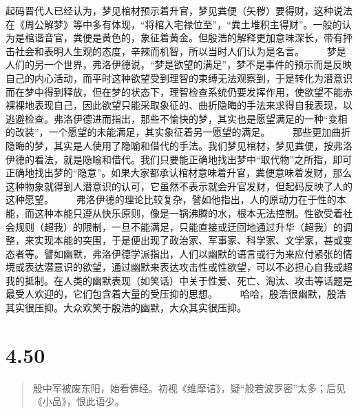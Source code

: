 \documentclass[]{book}
\begin{document}
起码晋代人已经认为，梦见棺材预示着升官，梦见粪便（矢秽）要得财，这种说法在《周公解梦》等中多有体现，``将棺入宅禄位至''，``粪土堆积主得财''。一般的认为是棺谐音官，粪便是黄色的，象征着黄金。但殷浩的解释更加意味深长，带有抨击社会和表明人生观的态度，辛辣而机智，所以当时人们认为是名言。
　　梦是人们的另一个世界，弗洛伊德说，``梦是欲望的满足''，梦不是事件的预示而是反映自己的内心活动，而平时这种欲望受到理智的束缚无法观察到，于是转化为潜意识而在梦中得到释放，但在梦的状态下，理智检查系统仍要发挥作用，使欲望不能赤裸裸地表现自己，因此欲望只能采取象征的、曲折隐晦的手法来求得自我表现，以逃避检查。弗洛伊德进而指出，那些不愉快的梦，其实也是愿望满足的一种``变相的改装''，一个愿望的未能满足，其实象征着另一愿望的满足。
　　那些更加曲折隐晦的梦，其实是人使用了隐喻和借代的手法。我们梦见棺材，梦见粪便，按弗洛伊德的看法，就是隐喻和借代。我们只要能正确地找出梦中``取代物''之所指，即可正确地找出梦的``隐意''。如果大家都承认棺材意味着升官，粪便意味着发财，那么这种物象就得到人潜意识的认可，它虽然不表示就会升官发财，但起码反映了人的这种愿望。
　　弗洛伊德的理论比较复杂，譬如他指出，人的原动力在于性的本能，而这种本能只遵从快乐原则，像是一锅沸腾的水，根本无法控制。性欲受着社会规则（超我）的限制，一旦不能满足，只能直接或迂回地通过升华（超我）的调整，来实现本能的突围，于是便出现了政治家、军事家、科学家、文学家，甚或变态者等。譬如幽默，弗洛伊德学派指出，人们以幽默的语言或行为来应付紧张的情境或表达潜意识的欲望，通过幽默来表达攻击性或性欲望，可以不必担心自我或超我的抵制。在人类的幽默表现（如笑话）中关于性爱、死亡、淘汰、攻击等话题是最受人欢迎的，它们包含着大量的受压抑的思想。
　　哈哈，殷浩很幽默，殷浩其实很压抑。大众欢笑于殷浩的幽默，大众其实很压抑。

\section{4.50}\label{section-228}

\begin{quote}
殷中军被废东阳，始看佛经。初视《维摩诘》，疑``般若波罗密''太多；后见《小品》，恨此语少。
\end{quote}
\end{document}
